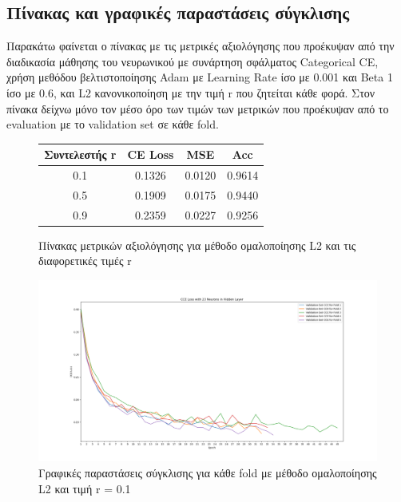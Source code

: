 \documentclass[12pt,a4paper]{article}
\begin{document}
\subsection{Πίνακας και γραφικές παραστάσεις σύγκλισης}

Παρακάτω φαίνεται ο πίνακας με τις μετρικές αξιολόγησης που προέκυψαν από την διαδικασία μάθησης του νευρωνικού με συνάρτηση σφάλματος Categorical CE, χρήση μεθόδου βελτιστοποίησης Adam με Learning Rate ίσο με 0.001 και Beta 1 ίσο με 0.6, και L2 κανονικοποίηση με την τιμή r που ζητείται κάθε φορά. Στον πίνακα δείχνω μόνο τον μέσο όρο των τιμών των μετρικών που προέκυψαν από το evaluation με το validation set σε κάθε fold.

\begin{figure}[H]
    \begin{center}
    \begin{tabular}{ |c|c|c|c| } 
        \hline
        \textbf{Συντελεστής r} & \textbf{CE Loss} & \textbf{MSE} & \textbf{Acc} \\ \hline
        0.1 & 0.1326 & 0.0120 & 0.9614 \\
        \hline
        0.5 & 0.1909 & 0.0175 & 0.9440 \\
        \hline
        0.9 & 0.2359 & 0.0227 & 0.9256 \\ 
        \hline
    \end{tabular}
    \end{center}
    \caption{Πίνακας μετρικών αξιολόγησης για μέθοδο ομαλοποίησης L2 και τις διαφορετικές τιμές r}
\end{figure}

\begin{figure}[H]
	\includegraphics[width=\textwidth]{28. L2 with r = 0.1.png}
	\caption{Γραφικές παραστάσεις σύγκλισης για κάθε fold με μέθοδο ομαλοποίησης L2 και τιμή r = 0.1}
\end{figure}
\end{document}
